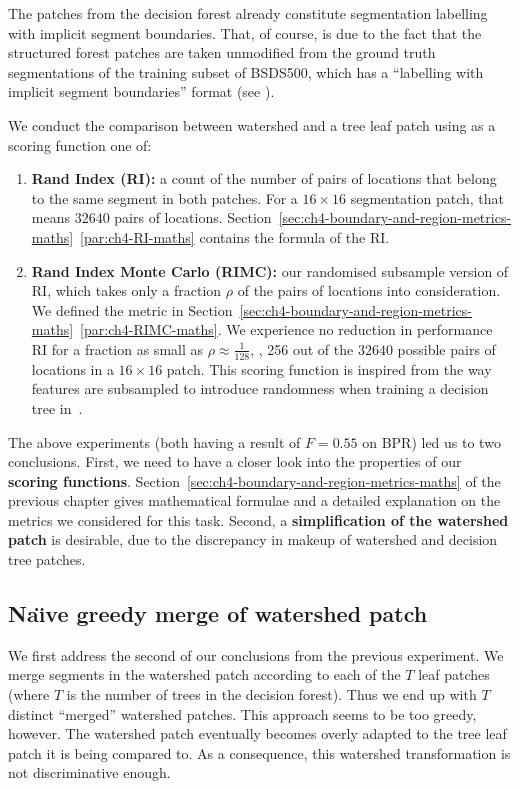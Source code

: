 The patches from the decision forest already constitute segmentation labelling with implicit segment boundaries. That, of course, is due to the fact that the structured forest patches are taken unmodified from the ground truth segmentations of the training subset of BSDS500, which has a ``labelling with implicit segment boundaries'' format (see ). 

We conduct the comparison between watershed and a tree leaf patch using as a scoring function one of:

\begin{enumerate}
 \item{\bf Rand Index (RI):} a count of the number of pairs of locations that belong to the same segment in both patches. For a $16\times16$ segmentation patch, that means $32 640$ pairs of locations. Section~\ref*{sec:ch4-boundary-and-region-metrics-maths}~\ref{par:ch4-RI-maths} contains the formula of the RI.
 \item{\bf Rand Index Monte Carlo (RIMC):} our randomised subsample version of RI, which takes only a fraction $\rho$ of the pairs of locations into consideration. We defined %
 the metric in Section~\ref*{sec:ch4-boundary-and-region-metrics-maths}~\ref{par:ch4-RIMC-maths}. We experience no reduction in performance \wrt RI for a fraction as small as $\rho\approx\frac{1}{128}$, \ie, 256 out of the $32 640$ possible pairs of locations in a $16 \times 16$ patch. This scoring function is inspired from the way features are subsampled to introduce randomness when training a decision tree in~\cite{DollarICCV13edges,Dollar2013toolbox}.
\end{enumerate}

The above experiments (both having a result of $F=0.55$ on BPR) led us to two conclusions. First, we need to have a closer look into the properties of our \textbf{scoring functions}. Section~\ref{sec:ch4-boundary-and-region-metrics-maths} of the previous chapter gives mathematical formulae and a detailed explanation on the metrics we considered for this task. Second, a \textbf{simplification of the watershed patch} is desirable, due to the discrepancy %
in makeup %
of watershed and decision tree patches.

\subsection{Na\"{\i}ve greedy merge of watershed patch}
We first address the second of our conclusions from the previous experiment. We merge segments in the watershed patch according to each of the $T$ leaf patches (where $T$ is the number of trees in the decision forest). Thus we end up with $T$ distinct ``merged'' watershed patches. This approach seems to be too greedy, however. The watershed patch eventually becomes overly adapted to the tree leaf patch it is being compared to. As a consequence, this watershed transformation is not discriminative enough.

